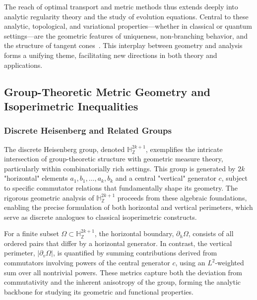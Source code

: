 \vspace{1em}
\noindent
The reach of optimal transport and metric methods thus extends deeply into analytic regularity theory and the study of evolution equations. Central to these analytic, topological, and variational properties—whether in classical or quantum settings—are the geometric features of uniqueness, non-branching behavior, and the structure of tangent cones~\cite{ref96,ref97,ref107}. This interplay between geometry and analysis forms a unifying theme, facilitating new directions in both theory and applications.

\subsection{Group-Theoretic Metric Geometry and Isoperimetric Inequalities}

\subsubsection{Discrete Heisenberg and Related Groups}

The discrete Heisenberg group, denoted $\mathbb{H}_{\mathbb{Z}}^{2k+1}$, exemplifies the intricate intersection of group-theoretic structure with geometric measure theory, particularly within combinatorially rich settings. This group is generated by $2k$ "horizontal" elements $a_1, b_1, \ldots, a_k, b_k$ and a central "vertical" generator $c$, subject to specific commutator relations that fundamentally shape its geometry. The rigorous geometric analysis of $\mathbb{H}_{\mathbb{Z}}^{2k+1}$ proceeds from these algebraic foundations, enabling the precise formulation of both horizontal and vertical perimeters, which serve as discrete analogues to classical isoperimetric constructs.

For a finite subset $\Omega \subset \mathbb{H}_{\mathbb{Z}}^{2k+1}$, the horizontal boundary, $\partial_{h}\Omega$, consists of all ordered pairs that differ by a horizontal generator. In contrast, the vertical perimeter, $|\partial_{v} \Omega|$, is quantified by summing contributions derived from commutators involving powers of the central generator $c$, using an $L^2$-weighted sum over all nontrivial powers. These metrics capture both the deviation from commutativity and the inherent anisotropy of the group, forming the analytic backbone for studying its geometric and functional properties.

